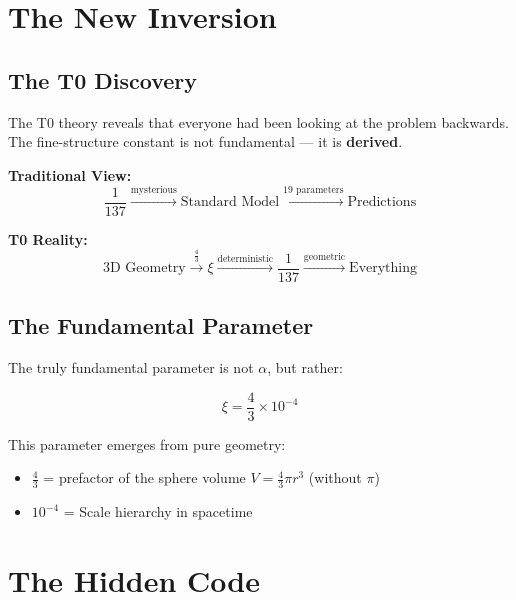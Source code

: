 	\section{The New Inversion}
	
	\subsection{The T0 Discovery}
	
	The T0 theory reveals that everyone had been looking at the problem backwards. The fine-structure constant is not fundamental — it is \textbf{derived}.
	
	\begin{tcolorbox}[colback=green!5!white,colframe=green!50!black,title=The Change of Perspective]
		\textbf{Traditional View:}
		\begin{equation}
			\frac{1}{137} \xrightarrow{\text{mysterious}} \text{Standard Model} \xrightarrow{\text{19 parameters}} \text{Predictions}
		\end{equation}
		
		\textbf{T0 Reality:}
		\begin{equation}
			\text{3D Geometry} \xrightarrow{\frac{4}{3}} \xi \xrightarrow{\text{deterministic}} \frac{1}{137} \xrightarrow{\text{geometric}} \text{Everything}
		\end{equation}
	\end{tcolorbox}
	
	\subsection{The Fundamental Parameter}
	
	The truly fundamental parameter is not $\alpha$, but rather:
	
	\begin{equation}
		\boxed{\xi = \frac{4}{3} \times 10^{-4}}
	\end{equation}
	
	This parameter emerges from pure geometry:
	\begin{itemize}
		\item $\frac{4}{3}$ = prefactor of the sphere volume $V = \frac{4}{3}\pi r^3$ (without $\pi$)
		\item $10^{-4}$ = Scale hierarchy in spacetime
	\end{itemize}
	
	\section{The Hidden Code}
	
